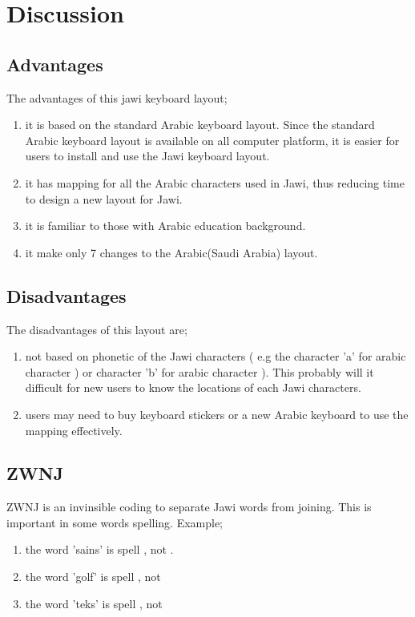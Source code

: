 \documentclass[12pt,a4paper]{IEEEconf}
\begin{document}
\section{Discussion}

\subsection{Advantages}

The advantages of this jawi keyboard layout;
\begin{enumerate}
\item it is based on the standard Arabic keyboard layout. Since the standard Arabic keyboard layout is available on all computer platform, it is easier for users to install and use the Jawi keyboard layout. 
\item it has mapping for all the Arabic characters used in Jawi, thus reducing time to design a new layout for Jawi.
\item it is familiar to those with Arabic education background.
\item it make only 7 changes to the Arabic(Saudi Arabia) layout.
\end{enumerate}


\subsection{Disadvantages}

The disadvantages of this layout are;
\begin{enumerate}
\item not based on phonetic of the Jawi characters ( e.g the character 'a' for arabic character ) or character 'b' for arabic character  ). This probably will it difficult for new users to know the locations of each Jawi characters.
\item users may need to buy keyboard stickers or a new Arabic keyboard to use the mapping effectively. 
\end{enumerate}

\subsection{ZWNJ} \label{subsec:zwnj}

ZWNJ is an invinsible coding to separate Jawi words from joining. This is important in some words spelling. Example;
\begin{enumerate}
\item the word 'sains' is spell , not .
\item the word 'golf' is spell , not 
\item the word 'teks' is spell , not 
\end{enumerate}
\end{document}
